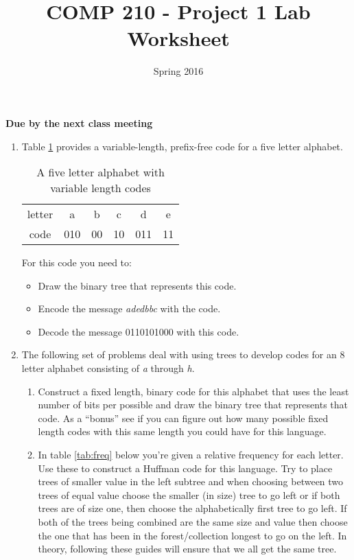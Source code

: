 \documentclass[]{article}
\title{COMP 210 - Project 1 Lab Worksheet}
\author{}
\date{Spring 2016}
\begin{document}
\maketitle
\thispagestyle{empty}

\begin{center}
\textbf{Due by the next class meeting}
\end{center}

\begin{enumerate}

\item Table \ref{tab:code} provides a variable-length, prefix-free code for a five letter alphabet. 
\begin{table}[!htpb]
\begin{center}
\begin{tabular}{cccccc}
letter    & a & b & c & d &  e \\
code & 010 &  00 & 10 &  011 & 11
\end{tabular}
\end{center}
\caption{A five letter alphabet with variable length codes}
\label{tab:code}
\end{table}

For this code you need to:
\begin{itemize}
\item Draw the binary tree that represents this code. 
\item Encode the message \textit{adedbbc} with the code. 
\item Decode the message 0110101000 with this code. 
\end{itemize}




\item The following set of problems deal with using trees to develop codes for an 8 letter alphabet consisting of \textit{a} through \textit{h}.
\begin{enumerate}
\item Construct a fixed length, binary code for this alphabet that uses the least number of bits per possible and draw the binary tree that represents that code. As a ``bonus'' see if you can figure out how many possible fixed length codes with this same length you could have for this language.
\newpage \thispagestyle{empty}

\item In table \ref{tab:freq} below you're given a relative frequency for each letter. Use these to construct a Huffman code for this language. Try to place trees of smaller value in the left subtree and when choosing between two trees of equal value choose the smaller (in size) tree to go left or if both trees are of size one, then choose the alphabetically first tree to go left. If both of the trees being combined are the same size and value then choose the one that has been in the forest/collection longest to go on the left. In theory, following these guides will ensure that we all get the same tree. 


\end{enumerate}
\end{enumerate}
\end{document}
